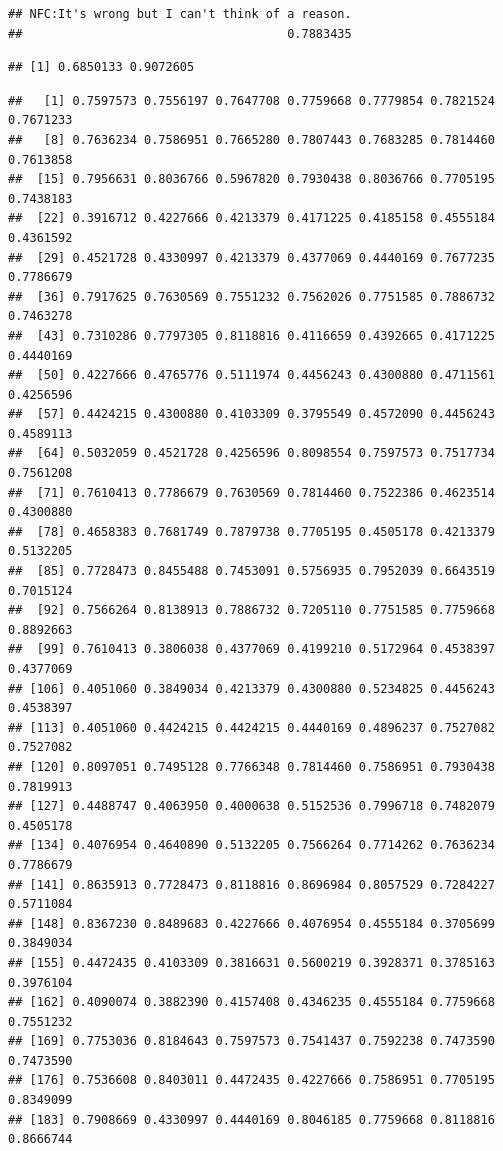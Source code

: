 \documentclass[
  american,
  man,floatsintext]{apa7}
\begin{document}
\begin{verbatim}
## NFC:It's wrong but I can't think of a reason. 
##                                     0.7883435
\end{verbatim}

\begin{verbatim}
## [1] 0.6850133 0.9072605
\end{verbatim}

\begin{verbatim}
##   [1] 0.7597573 0.7556197 0.7647708 0.7759668 0.7779854 0.7821524 0.7671233
##   [8] 0.7636234 0.7586951 0.7665280 0.7807443 0.7683285 0.7814460 0.7613858
##  [15] 0.7956631 0.8036766 0.5967820 0.7930438 0.8036766 0.7705195 0.7438183
##  [22] 0.3916712 0.4227666 0.4213379 0.4171225 0.4185158 0.4555184 0.4361592
##  [29] 0.4521728 0.4330997 0.4213379 0.4377069 0.4440169 0.7677235 0.7786679
##  [36] 0.7917625 0.7630569 0.7551232 0.7562026 0.7751585 0.7886732 0.7463278
##  [43] 0.7310286 0.7797305 0.8118816 0.4116659 0.4392665 0.4171225 0.4440169
##  [50] 0.4227666 0.4765776 0.5111974 0.4456243 0.4300880 0.4711561 0.4256596
##  [57] 0.4424215 0.4300880 0.4103309 0.3795549 0.4572090 0.4456243 0.4589113
##  [64] 0.5032059 0.4521728 0.4256596 0.8098554 0.7597573 0.7517734 0.7561208
##  [71] 0.7610413 0.7786679 0.7630569 0.7814460 0.7522386 0.4623514 0.4300880
##  [78] 0.4658383 0.7681749 0.7879738 0.7705195 0.4505178 0.4213379 0.5132205
##  [85] 0.7728473 0.8455488 0.7453091 0.5756935 0.7952039 0.6643519 0.7015124
##  [92] 0.7566264 0.8138913 0.7886732 0.7205110 0.7751585 0.7759668 0.8892663
##  [99] 0.7610413 0.3806038 0.4377069 0.4199210 0.5172964 0.4538397 0.4377069
## [106] 0.4051060 0.3849034 0.4213379 0.4300880 0.5234825 0.4456243 0.4538397
## [113] 0.4051060 0.4424215 0.4424215 0.4440169 0.4896237 0.7527082 0.7527082
## [120] 0.8097051 0.7495128 0.7766348 0.7814460 0.7586951 0.7930438 0.7819913
## [127] 0.4488747 0.4063950 0.4000638 0.5152536 0.7996718 0.7482079 0.4505178
## [134] 0.4076954 0.4640890 0.5132205 0.7566264 0.7714262 0.7636234 0.7786679
## [141] 0.8635913 0.7728473 0.8118816 0.8696984 0.8057529 0.7284227 0.5711084
## [148] 0.8367230 0.8489683 0.4227666 0.4076954 0.4555184 0.3705699 0.3849034
## [155] 0.4472435 0.4103309 0.3816631 0.5600219 0.3928371 0.3785163 0.3976104
## [162] 0.4090074 0.3882390 0.4157408 0.4346235 0.4555184 0.7759668 0.7551232
## [169] 0.7753036 0.8184643 0.7597573 0.7541437 0.7592238 0.7473590 0.7473590
## [176] 0.7536608 0.8403011 0.4472435 0.4227666 0.7586951 0.7705195 0.8349099
## [183] 0.7908669 0.4330997 0.4440169 0.8046185 0.7759668 0.8118816 0.8666744

\end{verbatim}
\end{document}
